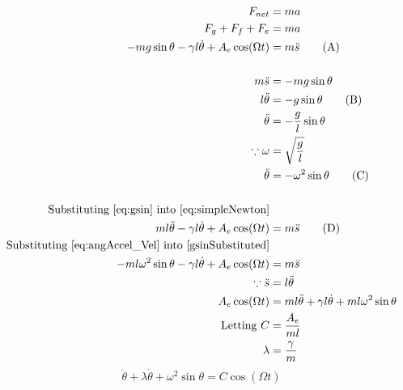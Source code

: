 \documentclass[letterpaper, 12pt]{article}
\begin{document}
\begingroup
\allowdisplaybreaks
\begin{align*}
    F_{net}                                                                & = ma
    \\
    F_g + F_f + F_e                                                        & = ma
    \\
    -mg\sin\theta - \gamma l\dot\theta + A_e \cos (\Omega t)               & = m\ddot s \tag{A} \label{eq:simpleNewton}
    \\
    \\
    m\ddot s                                                               & = -mg \sin\theta
    \\
    l\ddot \theta                                                          & = -g\sin\theta \tag{B} \label{eq:gsin}
    \\
    \ddot\theta                                                            & = -\frac{g}{l}\sin\theta
    \\
    \because \omega                                                        & = \sqrt{\frac{g}{l}}
    \\
    \ddot\theta                                                            & = -\omega^2\sin\theta \tag{C} \label{eq:angAccel_Vel}
    \\
    \\
    \text{Substituting \ref*{eq:gsin} into \ref*{eq:simpleNewton}}         &
    \\
    ml\ddot\theta - \gamma l\dot\theta + A_e \cos (\Omega t)               & = m\ddot s \tag{D} \label{gsinSubstituted}
    \\
    \text{Substituting \ref*{eq:angAccel_Vel} into \ref*{gsinSubstituted}} &
    \\
    -ml\omega^2\sin\theta - \gamma l\dot\theta + A_e \cos (\Omega t)       & = m\ddot s
    \\
    \because \ddot s                                                       & = l\ddot \theta
    \\
    A_e\cos(\Omega t)                                                      & = ml\ddot \theta + \gamma l\dot\theta + ml\omega^2\sin\theta
    \\
    \text{Letting } C                                                      & = \frac{A_e}{ml}
    \\
    \lambda                                                                & = \frac{\gamma}{m}
\end{align*}
\endgroup
\begin{equation} \label{eq:noApproximate}
    \ddot\theta + \lambda\dot\theta + \omega^2\sin\theta = C\cos(\Omega t)
\end{equation}
\end{document}
